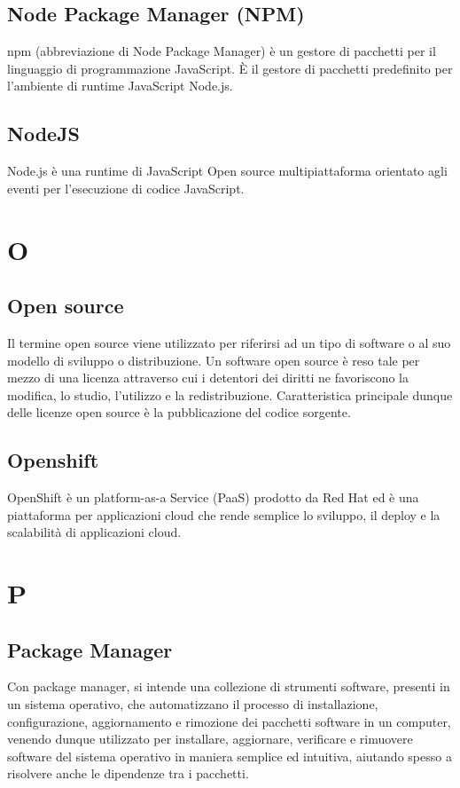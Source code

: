 \subsection{Node Package Manager (NPM)}  npm (abbreviazione di Node Package Manager) è un gestore di pacchetti per il linguaggio di programmazione JavaScript. È il gestore di pacchetti predefinito per l'ambiente di runtime JavaScript Node.js.
\subsection{NodeJS}  Node.js è una runtime di JavaScript Open source multipiattaforma orientato agli eventi per l'esecuzione di codice JavaScript.

\newpage \section{O}
\subsection{Open source}  Il termine open source  viene utilizzato per riferirsi ad un tipo di software o al suo modello di sviluppo o distribuzione. Un software open source è reso tale per mezzo di una licenza attraverso cui i detentori dei diritti ne favoriscono la modifica, lo studio, l'utilizzo e la redistribuzione. Caratteristica principale dunque delle licenze open source è la pubblicazione del codice sorgente.
\subsection{Openshift}  OpenShift è un platform-as-a Service (PaaS) prodotto da Red Hat ed è una piattaforma per applicazioni cloud che rende semplice lo sviluppo, il deploy e la scalabilità di applicazioni cloud. 


\newpage \section{P}
\subsection{Package Manager}  Con package manager, si intende una collezione di strumenti software, presenti in un sistema operativo, che automatizzano il processo di installazione, configurazione, aggiornamento e rimozione dei pacchetti software in un computer, venendo dunque utilizzato per installare, aggiornare, verificare e rimuovere software del sistema operativo in maniera semplice ed intuitiva, aiutando spesso a risolvere anche le dipendenze tra i pacchetti.
